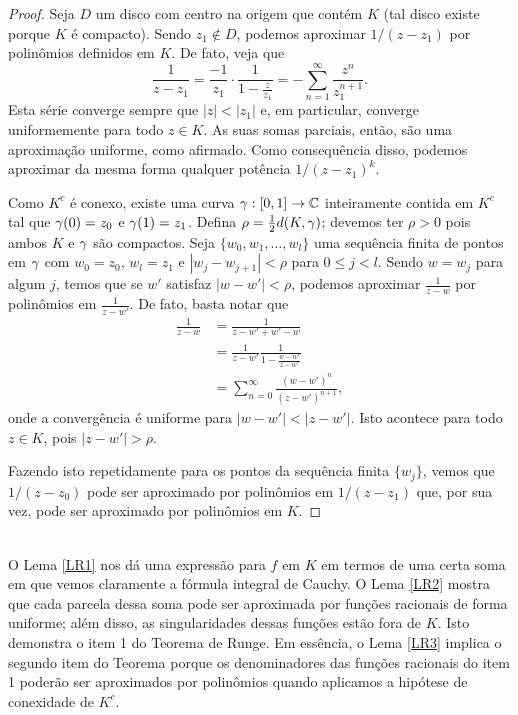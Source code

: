     \begin{proof}
        Seja $D$ um disco com centro na origem que contém $K$ (tal disco existe porque 
        $K$ é compacto). Sendo $z_1 \not \in D$, podemos aproximar $1/(z-z_1)$ por polinômios
        definidos em $K$. De fato, veja que
        \begin{equation*}
        \frac{1}{z-z_1}
        =
        \frac{-1}{z_1}\cdot\frac{1}{1-\frac{z}{z_1}} = - \sum_{n=1}^{\infty}\frac{z^n}{z_1^{n+1}}.
        \end{equation*}
        Esta série converge sempre que $|z| < |z_1|$ e, em particular, converge uniformemente 
        para todo $z \in K$. As suas somas parciais, então, são uma aproximação uniforme, 
        como afirmado. Como consequência disso, podemos aproximar da mesma forma qualquer 
        potência $1/(z-z_1)^k$.
        
        Como $K^c$ é conexo, existe uma curva $\gamma : [0,1] \to \mathbb{C}$ inteiramente contida em 
        $K^c$ tal que $\gamma(0) = z_0$ e $\gamma(1) =  z_1$. Defina $\rho = \frac{1}{2}d(K,\gamma)$;
        devemos ter $\rho > 0$ pois ambos $K$ e $\gamma$ são compactos. 
        Seja $\{w_0, w_1, \dots, w_l\}$ uma sequência finita de pontos em $\gamma$ com $w_0 = z_0$,
        $w_l = z_1$ e $|w_j - w_{j+1}| < \rho$ para $0 \leq j < l$. Sendo $w = w_j$ para algum $j$,
        temos que se $w'$ satisfaz $|w - w'| < \rho$, podemos aproximar $\frac{1}{z-w}$ 
        por polinômios em $\frac{1}{z-w'}$. De fato, basta notar que
        \begin{align*}
            \frac{1}{z-w} &= \frac{1}{z - w' + w' - w}\\
                          &= \frac{1}{z-w'}\frac{1}{1 - \frac{w - w'}{z - w'}}\\
                          &= \sum_{n = 0}^{\infty}\frac{(w-w')^n}{(z-w')^{n+1}},
        \end{align*}
        onde a convergência é uniforme para $|w-w'| < |z-w'|$. Isto acontece para todo 
        $z \in K$, pois $|z-w'|> \rho$.
        
        Fazendo isto repetidamente para os pontos da sequência finita $\{w_j\}$, vemos que 
        $1/(z-z_0)$ pode ser aproximado por polinômios em $1/(z-z_1)$ que, por sua vez, pode 
        ser aproximado por polinômios em $K$.
    \end{proof}
    \\
    
    O Lema \ref{LR1} nos dá uma expressão para $f$ em $K$ em termos de uma certa soma em 
    que vemos claramente a fórmula integral de Cauchy. O Lema \ref{LR2} mostra que cada parcela 
    dessa soma pode ser aproximada por funções racionais de forma uniforme; além disso, as
    singularidades dessas funções estão fora de $K$. Isto demonstra o item 1 do Teorema de Runge. 
    Em essência, o Lema \ref{LR3} implica o segundo item do Teorema porque os denominadores das
    funções racionais do item 1 poderão ser aproximados por polinômios quando aplicamos a hipótese
    de conexidade de $K^c$.
    
